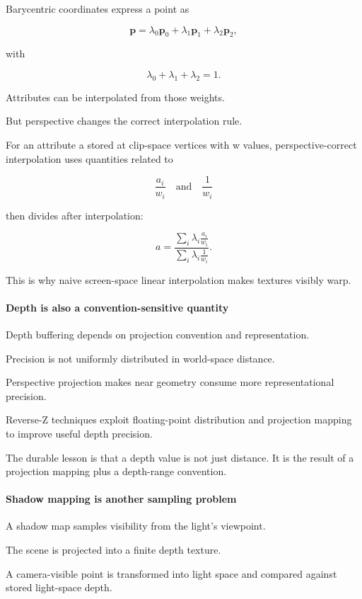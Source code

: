 Barycentric coordinates express a point as

\[
\mathbf p
=
\lambda_0\mathbf p_0
+
\lambda_1\mathbf p_1
+
\lambda_2\mathbf p_2,
\]

with

\[
\lambda_0+\lambda_1+\lambda_2=1.
\]

Attributes can be interpolated from those weights.

But perspective changes the correct interpolation rule.

For an attribute a stored at clip-space vertices with w values, perspective-correct interpolation uses quantities related to

\[
\frac{a_i}{w_i}
\quad\text{and}\quad
\frac{1}{w_i}
\]

then divides after interpolation:

\[
a
=
\frac{
\sum_i \lambda_i \frac{a_i}{w_i}
}{
\sum_i \lambda_i \frac{1}{w_i}
}.
\]

This is why naive screen-space linear interpolation makes textures visibly warp.

\paragraph{Depth is also a convention-sensitive quantity}\label{depth-is-also-a-convention-sensitive-quantity}

Depth buffering depends on projection convention and representation.

Precision is not uniformly distributed in world-space distance.

Perspective projection makes near geometry consume more representational precision.

Reverse-Z techniques exploit floating-point distribution and projection mapping to improve useful depth precision.

The durable lesson is that a depth value is not just distance. It is the result of a projection mapping plus a depth-range convention.

\paragraph{Shadow mapping is another sampling problem}\label{shadow-mapping-is-another-sampling-problem}

A shadow map samples visibility from the light's viewpoint.

The scene is projected into a finite depth texture.

A camera-visible point is transformed into light space and compared against stored light-space depth.

